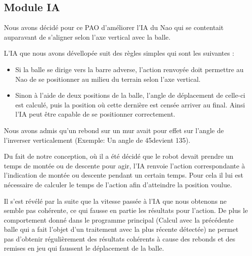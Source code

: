 \subsection{Module IA}
\label{sub:Module IA}
\par Nous avons décidé pour ce PAO d'améliorer l'IA du Nao qui se contentait
auparavant de s'aligner selon l'axe vertical avec la balle.

\par L'IA que nous avons dévellopée suit des règles simples qui sont les
suivantes :

\begin{itemize}
	\item Si la balle se dirige vers la barre adverse, l'action renvoyée doit
		permettre au Nao de se positionner au milieu du terrain selon l'axe
		vertical.
	\item Sinon à l'aide de deux positions de la balle, l'angle de déplacement
		de celle-ci est calculé, puis la position où cette dernière est censée
		arriver au final. Ainsi l'IA peut être capable de se positionner
		correctement.
\end{itemize}

\par Nous avons admis qu'un rebond sur un mur avait pour effet sur l'angle de
l'inverser verticalement (Exemple: Un angle de 45\degre devient 135\degre).

\par Du fait de notre conception, où il a été décidé que le robot devait
prendre un temps de montée ou de descente pour agir, l'IA renvoie l'action correspondante
à l'indication de montée ou descente pendant un certain temps.
Pour cela il lui est nécessaire de calculer le temps de l'action afin
d'atteindre la position voulue.

\par Il s'est révélé par la suite que la vitesse passée à l'IA que nous obtenons ne
semble pas cohérente, ce qui fausse en partie les résultats pour l'action. De plus
le comportement donné dans le programme principal (Calcul avec la précédente balle
qui a fait l'objet d'un traitement avec la plus récente détectée) ne permet pas
d'obtenir régulièrement des résultats cohérents à cause des rebonds et des remises
en jeu qui faussent le déplacement de la balle.
